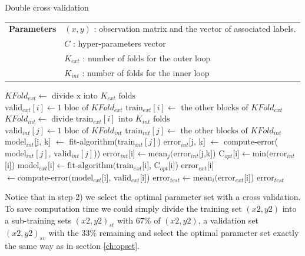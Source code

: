\documentclass[a4paper,12pt,oneside,final]{report}
\begin{document}
\begin{algorithm}[H]
     \caption{\small Double cross validation}
     \label{alg:double_cross_val} 
     \begin{algorithmic}
       \STATE \begin{tabular}{@{\hspace{0cm}}p{1.8cm}l}
       \textbf{Parameters}  & $(x, y)$ : observation matrix and the vector of associated labels.\\
           & $C$ : hyper-parameters vector\\
           & $K_{ext}$ : number of folds for the outer loop\\
           & $K_{int}$ : number of folds for the inner loop\\
       \end{tabular}
       \STATE $KFold_{ext} \leftarrow \text{ divide x into } K_{ext} \text{ folds}$\\
         \STATE $\text{valid}_{ext}[i] \leftarrow 1 \text{ bloc of } KFold_{ext}$
         \STATE $\text{train}_{ext}[i] \leftarrow \text{ the other blocks of } KFold_{ext}$
         \STATE $KFold_{int} \leftarrow \text{ divide train}_{ext}[i] \text{ into } K_{int} \text{ folds}$\\
            \STATE $\text{valid}_{int}[j] \leftarrow 1 \text{ bloc of } KFold_{int}$
            \STATE $\text{train}_{int}[j] \leftarrow \text{ the other blocks of } KFold_{int}$
               \STATE $\text{model}_{int}$[j, k] $\leftarrow$ fit-algorithm($\text{train}_{int}[j]$)
               \STATE $\text{error}_{int}$[j, k] $\leftarrow$ compute-error($\text{model}_{int}[j]$, $\text{valid}_{int}[j]$))
            \ENDFOR
         \ENDFOR
         \STATE $\text{error}_{int}$[i]$ \leftarrow  \text{mean}_j( \text{error}_{int}$[j,k])
         \STATE $\text{C}_{opt}$[i]$     \leftarrow  \text{min}( \text{error}_{int}$[i])
         \STATE $\text{model}_{ext}$[i]$ \leftarrow  \text{fit-algorithm}( \text{train}_{ext}$[i], $\text{C}_{opt}$[i])
         \STATE $\text{error}_{ext}$[i]$ \leftarrow  \text{compute-error}( \text{model}_{ext}$[i], $\text{valid}_{ext}$[i])
     \ENDFOR 
     \STATE $\text{error}_{test} \leftarrow  \text{mean}_i( \text{error}_{ext}$[i])
     \RETURN $\text{error}_{test}$ 
     \end{algorithmic}
   \end{algorithm}

Notice that in step 2) we select the optimal parameter set with a cross validation. To save computation time we could simply divide the training set $(x2,y2)$ into a sub-training sets $(x2,y2)_{st}$ with $67\%$ of $(x2,y2)$, a validation set $(x2,y2)_{sv}$ with the $33\%$ remaining and select the optimal parameter set exactly the same way as in section \ref{ch:opset}.
\end{document}
